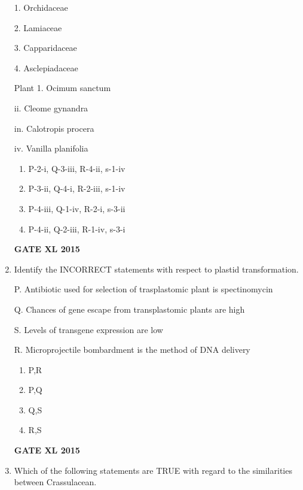 \documentclass[journal,12pt,onecolumn]{IEEEtran}
\begin{document}
\begin{enumerate}
\begin{minipage}{0.3\textwidth}
\begin{flushleft}
1. Orchidaceae

2. Lamiaceae

3. Capparidaceae

4. Asclepiadaceae

	\end{flushleft}
\end{minipage}
\begin{minipage}{0.3\textwidth}
	\begin{flushleft}
Plant
1. Ocimum sanctum

ii. Cleome gynandra

in. Calotropis procera

iv. Vanilla planifolia
	\end{flushleft}
\end{minipage}
    \begin{enumerate}
	\item P-2-i, Q-3-iii, R-4-ii, s-1-iv            
	\item P-3-ii, Q-4-i, R-2-iii, s-1-iv            
	\item P-4-iii, Q-1-iv, R-2-i, s-3-ii            
	\item P-4-ii, Q-2-iii, R-1-iv, s-3-i            
    \end{enumerate}
\begin{flushright}\textbf{GATE XL 2015}\end{flushright}
\item  Identify the INCORRECT statements with respect to plastid transformation.

P. Antibiotic used for selection of trasplastomic plant is spectinomycin

Q. Chances of gene escape from transplastomic plants are high

S. Levels of transgene expression are low

R. Microprojectile bombardment is the method of DNA delivery
    \begin{enumerate}
            \item P,R
	    \item P,Q
	    \item Q,S
            \item R,S
    \end{enumerate}
\begin{flushright}\textbf{GATE XL 2015}\end{flushright}
\item Which of the following statements are TRUE with regard to the similarities between Crassulacean.


\end{enumerate}
\end{document}
